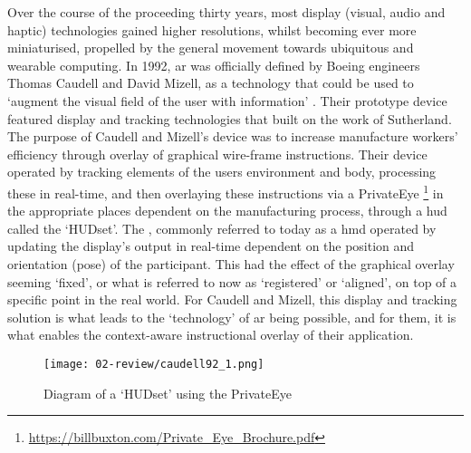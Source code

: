 Over the course of the proceeding thirty years, most display (visual, audio and haptic) technologies gained higher resolutions, whilst becoming ever more miniaturised, propelled by the general movement towards ubiquitous and wearable computing. In 1992, \gls{ar} was officially defined by Boeing engineers Thomas Caudell and David Mizell, as a technology that could be used to `augment the visual field of the user with information' \citeyearpar{caudell1992}. Their prototype device featured display and tracking technologies that built on the work of Sutherland. The purpose of Caudell and Mizell's device was to increase manufacture workers' efficiency through overlay of graphical wire-frame instructions. Their device operated by tracking elements of the users environment and body, processing these in real-time, and then overlaying these instructions via a PrivateEye \footnote{\url{https://billbuxton.com/Private_Eye_Brochure.pdf}} in the appropriate places dependent on the manufacturing process, through a \gls{hud} called the `HUDset'. The , commonly referred to today as a \gls{hmd} operated by updating the display's output in real-time dependent on the position and orientation (pose) of the participant. This had the effect of the graphical overlay seeming `fixed', or what is referred to now as `registered' or `aligned', on top of a specific point in the real world. For Caudell and Mizell, this display and tracking solution is what leads to the `technology' of \gls{ar} being possible, and for them, it is what enables the context-aware instructional overlay of their application.

\begin{figure}
    \centering
    \texttt{[image: 02-review/caudell92\_1.png]}
    \captionsetup{justification=centering,margin=1.5cm}
    \caption{Diagram of a `HUDset' using the PrivateEye \citep[in][]{caudell1992}}\label{fig: caudellprivateeye}
\end{figure}

